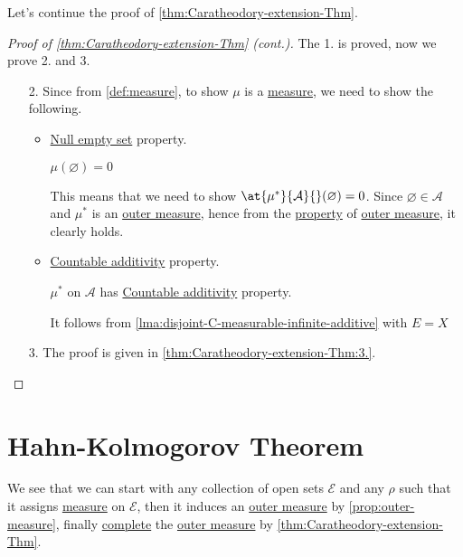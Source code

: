Let's continue the proof of \autoref{thm:Caratheodory-extension-Thm}.
\begin{proof}[Proof of \autoref{thm:Caratheodory-extension-Thm} (cont.)]\label{pf:Caratheodory-extension-Thm-cont}
	The 1. is proved, now we prove 2. and 3.
	\begin{enumerate}[(1)]
		\item[2.] Since from \autoref{def:measure}, to show \(\mu \) is a \hyperref[def:measure]{measure}, we need to show the following.
		      \begin{itemize}
			      \item \hyperref[def:measure-null-empty-set]{Null empty set} property.
			            \begin{claim}
				            \(\mu (\varnothing ) = 0\)
			            \end{claim}
			            \begin{explanation}
				            This means that we need to show \(\at{\mu^{\ast} }{\mathcal{A}}{}(\varnothing ) = 0\). Since \(\varnothing \in \mathcal{A} \) and \(\mu^{\ast}\) is
				            an \hyperref[def:outer-measure]{outer measure}, hence from the \hyperref[def:outer-measure-null-empty-set]{property} of \hyperref[def:outer-measure]{outer measure}, it clearly holds.
			            \end{explanation}
			      \item \hyperref[def:measure-countable-additivity]{Countable additivity} property.
			            \begin{claim}
				            \(\mu ^{\ast} \) on \(\mathcal{A} \) has \hyperref[def:measure-countable-additivity]{Countable additivity} property.
			            \end{claim}
			            \begin{explanation}
				            It follows from \autoref{lma:disjoint-C-measurable-infinite-additive} with \(E = X\)
			            \end{explanation}
		      \end{itemize}
		\item[3.] The proof is given in \autoref{thm:Caratheodory-extension-Thm:3.}.
	\end{enumerate}
\end{proof}

\section{Hahn-Kolmogorov Theorem}
We see that we can start with any collection of open sets \(\mathcal{E}\) and any \(\rho\) such that it assigns \hyperref[def:measure]{measure} on \(\mathcal{E}\), then it induces an
\hyperref[def:outer-measure]{outer measure} by \autoref{prop:outer-measure}, finally \hyperref[def:complete-measure-space]{complete} the \hyperref[def:outer-measure]{outer measure} by \autoref{thm:Caratheodory-extension-Thm}.

